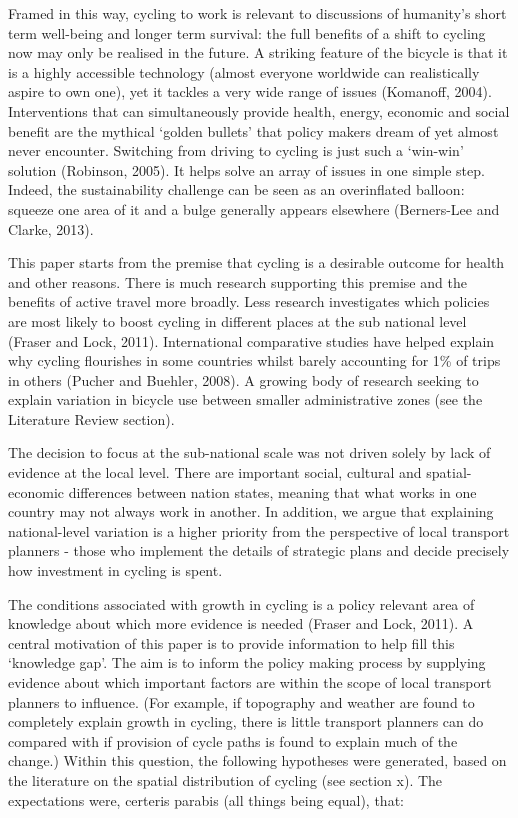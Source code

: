 Framed in this way, cycling to work is relevant to discussions of
humanity's short term well-being and longer term survival: the full
benefits of a shift to cycling now may only be realised in the future. A
striking feature of the bicycle is that it is a highly accessible
technology (almost everyone worldwide can realistically aspire to own
one), yet it tackles a very wide range of issues (Komanoff, 2004).
Interventions that can simultaneously provide health, energy, economic
and social benefit are the mythical `golden bullets' that policy makers
dream of yet almost never encounter. Switching from driving to cycling
is just such a `win-win' solution (Robinson, 2005). It helps solve an
array of issues in one simple step. Indeed, the sustainability challenge
can be seen as an overinflated balloon: squeeze one area of it and a
bulge generally appears elsewhere (Berners-Lee and Clarke, 2013).

This paper starts from the premise that cycling is a desirable outcome
for health and other reasons. There is much research supporting this
premise and the benefits of active travel more broadly. Less research
investigates which policies are most likely to boost cycling in
different places at the sub national level (Fraser and Lock, 2011).
International comparative studies have helped explain why cycling
flourishes in some countries whilst barely accounting for 1\% of trips
in others (Pucher and Buehler, 2008). A growing body of research seeking
to explain variation in bicycle use between smaller administrative zones
(see the Literature Review section).

The decision to focus at the sub-national scale was not driven solely by
lack of evidence at the local level. There are important social,
cultural and spatial-economic differences between nation states, meaning
that what works in one country may not always work in another. In
addition, we argue that explaining national-level variation is a higher
priority from the perspective of local transport planners - those who
implement the details of strategic plans and decide precisely how
investment in cycling is spent.

The conditions associated with growth in cycling is a policy relevant
area of knowledge about which more evidence is needed (Fraser and Lock,
2011). A central motivation of this paper is to provide information to
help fill this `knowledge gap'. The aim is to inform the policy making
process by supplying evidence about which important factors are within
the scope of local transport planners to influence. (For example, if
topography and weather are found to completely explain growth in
cycling, there is little transport planners can do compared with if
provision of cycle paths is found to explain much of the change.) Within
this question, the following hypotheses were generated, based on the
literature on the spatial distribution of cycling (see section x). The
expectations were, certeris parabis (all things being equal), that:

